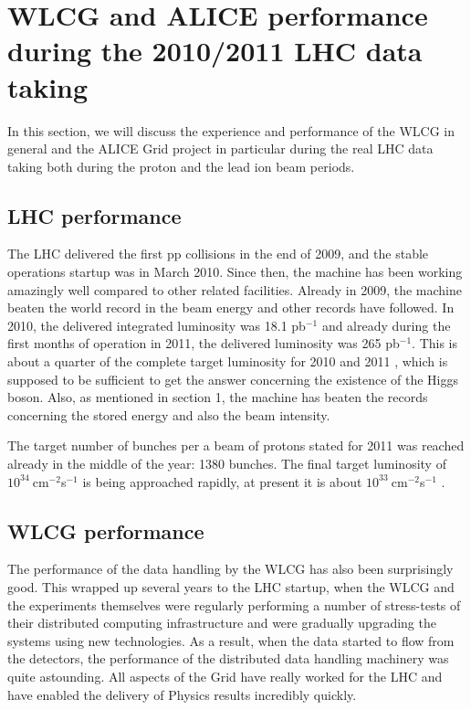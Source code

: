 \section{WLCG and ALICE performance during the 2010/2011 LHC data
taking}

In this section, we will discuss the experience and performance of
the WLCG in general and the ALICE Grid project in particular during
the real LHC data taking both during the proton and the lead ion
beam periods.

\subsection{LHC performance}
%
The LHC delivered the first pp collisions in the end of 2009, and
the stable operations startup was in March 2010. Since then, the
machine has been working amazingly well compared to other related
facilities. Already in 2009, the machine beaten the world record in
the beam energy and other records have followed. In 2010, the
delivered integrated luminosity was 18.1 pb${}^{-1}$ and already
during the first months of operation in 2011, the delivered
luminosity was 265 pb${}^{-1}$. This is about a quarter of the
complete target luminosity for 2010 and 2011 \cite{LHC_DR}, which is supposed
to be sufficient to get the answer concerning the existence of the
Higgs boson. Also, as mentioned in section 1, the machine has beaten
the records concerning the stored energy and also the beam
intensity.

The target number of bunches per a beam of protons stated for 2011
was reached already in the middle of the year: 1380 bunches. The
final target luminosity of $10^{34}\ $cm${}^{-2}$s${}^{-1}$ is being
approached rapidly, at present it is about
$10^{33}\ $cm${}^{-2}$s${}^{-1}$ \cite{LHC_STATS}.


\subsection{WLCG performance}
%
The performance of the data handling by the WLCG has also been
surprisingly good. This wrapped up several years to the LHC startup,
when the WLCG and the experiments themselves were regularly
performing a number of stress-tests of their distributed computing
infrastructure and were gradually upgrading the systems using new
technologies. As a result, when the data started to flow from the
detectors, the performance of the distributed data handling
machinery was quite astounding.  All aspects of the Grid have really
worked for the LHC and have enabled the delivery of Physics results
incredibly quickly.

